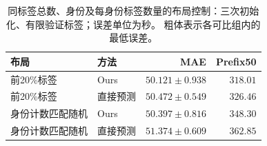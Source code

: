 \begin{table}[t]
\centering\footnotesize\setlength{\tabcolsep}{4pt}
\caption{同标签总数、身份及每身份标签数量的布局控制：三次初始化、有限验证标签；误差单位为秒。 粗体表示各可比组内的最低误差。}\label{tab:controlled_coverage}
\begin{tabular}{llrr}\toprule
布局 & 方法 & MAE & Prefix50\\\midrule
前20\%标签 & Ours & $\mathbf{50.121\pm0.938}$ & $\mathbf{318.01}$\\
前20\%标签 & 直接预测 & $50.472\pm0.549$ & $326.46$\\
身份计数匹配随机 & Ours & $\mathbf{50.397\pm0.816}$ & $\mathbf{348.30}$\\
身份计数匹配随机 & 直接预测 & $51.374\pm0.609$ & $362.85$\\
\bottomrule\end{tabular}
\end{table}
